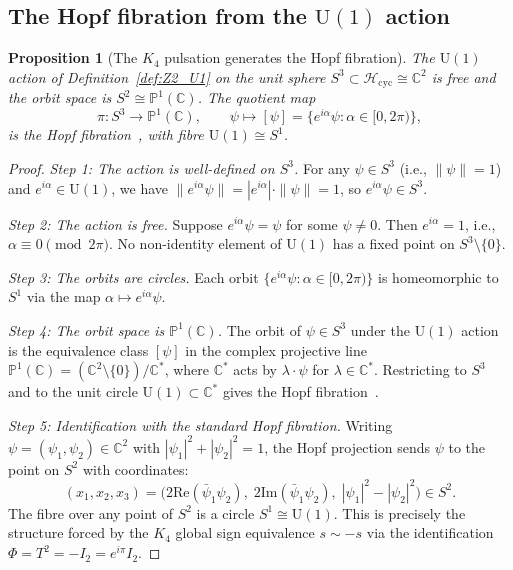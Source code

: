 \documentclass[12pt,a4paper]{article}
\newtheorem{proposition}[theorem]{Proposition}
\newcommand{\Hcycl}{\mathcal{H}_{\mathrm{cyc}}}
\newcommand{\CC}{\mathbb{C}}
\newcommand{\PP}{\mathbb{P}}
\begin{document}
\subsection{The Hopf fibration from the \texorpdfstring{$\mathrm{U}(1)$}{U(1)} action}

\begin{proposition}[The $K_4$ pulsation generates the Hopf fibration]
\label{prop:P1}
The $\mathrm{U}(1)$ action of Definition~\ref{def:Z2_U1} on the unit sphere
$S^3 \subset \Hcycl \cong \CC^2$ is free and the orbit space is $S^2 \cong \PP^1(\CC)$.
The quotient map
\begin{equation}
\pi : S^3 \to \PP^1(\CC), \qquad \psi \mapsto [\psi] = \{e^{i\alpha}\psi : \alpha \in [0,2\pi)\},
\label{eq:Hopf}
\end{equation}
is the Hopf fibration~\cite{Hopf_1931}, with fibre $\mathrm{U}(1) \cong S^1$.
\end{proposition}

\begin{proof}
\emph{Step 1: The action is well-defined on $S^3$.} For any $\psi \in S^3$ (i.e.,
$\|\psi\| = 1$) and $e^{i\alpha} \in \mathrm{U}(1)$, we have
$\|e^{i\alpha}\psi\| = |e^{i\alpha}|\cdot\|\psi\| = 1$, so $e^{i\alpha}\psi \in S^3$.

\emph{Step 2: The action is free.} Suppose $e^{i\alpha}\psi = \psi$ for some
$\psi \neq 0$. Then $e^{i\alpha} = 1$, i.e., $\alpha \equiv 0 \pmod{2\pi}$.
No non-identity element of $\mathrm{U}(1)$ has a fixed point on $S^3 \setminus \{0\}$.

\emph{Step 3: The orbits are circles.} Each orbit $\{e^{i\alpha}\psi : \alpha \in
[0,2\pi)\}$ is homeomorphic to $S^1$ via the map $\alpha \mapsto e^{i\alpha}\psi$.

\emph{Step 4: The orbit space is $\PP^1(\CC)$.} The orbit of $\psi \in S^3$ under
the $\mathrm{U}(1)$ action is the equivalence class $[\psi]$ in the complex projective
line $\PP^1(\CC) = (\CC^2 \setminus \{0\}) / \CC^*$, where $\CC^*$ acts by
$\lambda \cdot \psi$ for $\lambda \in \CC^*$. Restricting to $S^3$ and to the unit
circle $\mathrm{U}(1) \subset \CC^*$ gives the Hopf fibration~\cite{Hopf_1931}.

\emph{Step 5: Identification with the standard Hopf fibration.} Writing
$\psi = (\psi_1, \psi_2) \in \CC^2$ with $|\psi_1|^2 + |\psi_2|^2 = 1$, the Hopf
projection sends $\psi$ to the point on $S^2$ with coordinates:
\begin{equation}
(x_1, x_2, x_3) = \bigl(2\mathrm{Re}(\bar\psi_1\psi_2),\;
2\mathrm{Im}(\bar\psi_1\psi_2),\; |\psi_1|^2 - |\psi_2|^2\bigr) \in S^2.
\label{eq:Hopf_coords}
\end{equation}
The fibre over any point of $S^2$ is a circle $S^1 \cong \mathrm{U}(1)$.
This is precisely the structure forced by the $K_4$ global sign equivalence
$s \sim -s$ via the identification $\Phi = T^2 = -I_2 = e^{i\pi}I_2$.
\end{proof}
\end{document}
